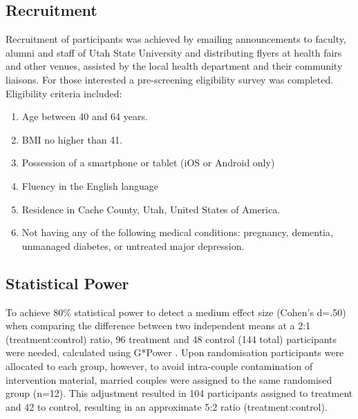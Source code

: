 \subsection{Recruitment}
Recruitment of participants was achieved by emailing announcements to faculty, alumni and staff of Utah State University and distributing flyers at health fairs and other venues, assisted by the local health department and their community liaisons. For those interested a pre-screening eligibility survey was completed. Eligibility criteria included:
\begin{enumerate}[noitemsep,topsep=0pt,label=(\alph*)]
\item Age between 40 and 64 years.
\item BMI no higher than 41.
\item Possession of a smartphone or tablet (iOS or Android only)
\item Fluency in the English language
\item Residence in Cache County, Utah, United States of America.
\item Not having any of the following medical conditions: pregnancy, dementia, unmanaged diabetes, or untreated major depression.
\end{enumerate}

\subsection{Statistical Power}
To achieve 80\% statistical power to detect a medium effect size (Cohen's d=.50) when comparing the difference between two independent means at a 2:1 (treatment:control) ratio, 96 treatment and 48 control (144 total) participants were needed, calculated using G*Power \cite{Faul2007}. Upon randomisation participants were allocated to each group, however, to avoid intra-couple contamination of intervention material, married couples were assigned to the same randomised group (n=12). This adjustment resulted in 104 participants assigned to treatment and 42 to control, resulting in an approximate 5:2 ratio (treatment:control).

